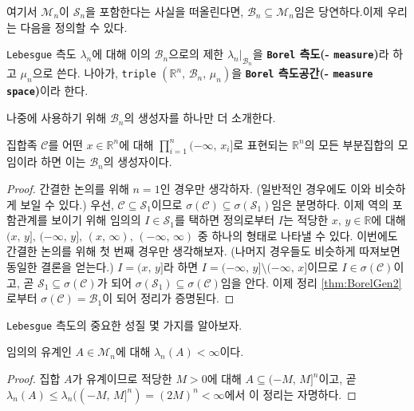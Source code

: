 여기서 $\mathcal{M}_n$이 $\mathcal{S}_n$을 포함한다는 사실을 떠올린다면, $\mathcal{B}_n\subseteq\mathcal{M}_n$임은 당연하다.\footnotemark 이제 우리는 다음을 정의할 수 있다.

\begin{definition}
    \texttt{Lebesgue} 측도 $\lambda_n$에 대해 이의 $\mathcal{B}_n$으로의 제한 $\lambda_n\vert_{\mathcal{B}_n}$을 \textbf{\texttt{Borel} 측도(- \texttt{measure})}라 하고 $\mu_n$으로 쓴다. 나아가, \texttt{triple} $(\mathbb{R}^n,\,\mathcal{B}_n,\,\mu_n)$을 \textbf{\texttt{Borel} 측도공간(- \texttt{measure space})}이라 한다.
\end{definition}

나중에 사용하기 위해 $\mathcal{B}_n$의 생성자를 하나만 더 소개한다.

\begin{theorem}\label{thm:BorelGen3}
    집합족 $\mathcal{C}$를 어떤 $x\in\mathbb{R}^n$에 대해 $\prod_{i=1}^n(-\infty,\,x_i]$로 표현되는 $\mathbb{R}^n$의 모든 부분집합의 모임이라 하면 이는 $\mathcal{B}_n$의 생성자이다.
\end{theorem}

\begin{proof}
    간결한 논의를 위해 $n=1$인 경우만 생각하자. (일반적인 경우에도 이와 비슷하게 보일 수 있다.) 우선, $\mathcal{C}\subseteq\mathcal{S}_1$이므로 $\sigma(\mathcal{C})\subseteq\sigma(\mathcal{S}_1)$임은 분명하다. 이제 역의 포함관계를 보이기 위해 임의의 $I\in\mathcal{S}_1$를 택하면 정의로부터 $I$는 적당한 $x,\,y\in\mathbb{R}$에 대해 $(x,\,y],\,(-\infty,\,y],\,(x,\,\infty),\,(-\infty,\,\infty)$ 중 하나의 형태로 나타낼 수 있다. 이번에도 간결한 논의를 위해 첫 번째 경우만 생각해보자.  (나머지 경우들도 비슷하게 따져보면 동일한 결론을 얻는다.) $I=(x,\,y]$라 하면 $I=(-\infty,\,y]\setminus(-\infty,\,x]$이므로 $I\in\sigma(\mathcal{C})$이고, 곧 $\mathcal{S}_1\subseteq\sigma(\mathcal{C})$가 되어 $\sigma(\mathcal{S}_1)\subseteq\sigma(\mathcal{C})$임을 안다. 이제 정리 \ref{thm:BorelGen2}로부터 $\sigma(\mathcal{C})=\mathcal{B}_1$이 되어 정리가 증명된다.
\end{proof}

\texttt{Lebesgue} 측도의 중요한 성질 몇 가지를 알아보자.

\begin{theorem}\label{thm:boundedMeasure}
    임의의 유계인 $A\in\mathcal{M}_n$에 대해 $\lambda_n(A)<\infty$이다.
\end{theorem}

\begin{proof}
    집합 $A$가 유계이므로 적당한 $M>0$에 대해 $A\subseteq(-M,\,M]^n$이고, 곧 $\lambda_n(A)\leq\lambda_n((-M,\,M]^n)=(2M)^n<\infty$에서 이 정리는 자명하다.
\end{proof}


